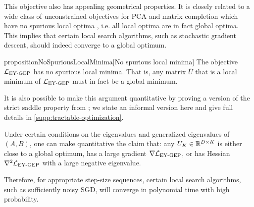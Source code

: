 This objective also has appealing geometrical properties.
It is closely related to a wide class of unconstrained objectives for PCA and matrix completion which have no spurious local optima \citep{ge_no_2017}, i.e. all local optima are in fact global optima.
This implies that certain local search algorithms, such as stochastic gradient descent, should indeed converge to a global optimum.

\begin{restatable}{proposition}{NoSpuriousLocalMinima}[No spurious local minima]\label{prop:no-spurious}
The objective $\mathcal{L}_\text{EY-GEP}$ has no spurious local minima.
That is, any matrix $\bar{U}$ that is a local minimum of $\mathcal{L}_\text{EY-GEP}$ must in fact be a global minimum.
\end{restatable}

It is also possible to make this argument quantitative by proving a version of the strict saddle property from \cite{ge_no_2017,ge2015escaping}; we state an informal version here and give full details in \cref{supp:tractable-optimization}.

\begin{corollary}
    Under certain conditions on the eigenvalues and generalized eigenvalues of $(A,B)$, one can make quantitative the claim that:
    any $U_K \in \mathbb{R}^{D \times K}$ is either close to a global optimum, has a large gradient $\nabla \mathcal{L}_\text{EY-GEP}$, or has Hessian $\nabla^2 \mathcal{L}_\text{EY-GEP}$ with a large negative eigenvalue.

    Therefore, for appropriate step-size sequences, certain local search algorithms, such as sufficiently noisy SGD, will converge in polynomial time with high probability.
\end{corollary}

